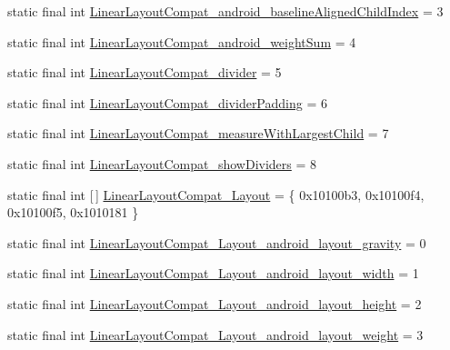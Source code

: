 \begin{DoxyCompactItemize}
\item 
static final int \mbox{\hyperlink{classandroid_1_1support_1_1v7_1_1appcompat_1_1_r_1_1styleable_a1e2dfafdd5b19904cd76f4e712341057}{Linear\+Layout\+Compat\+\_\+android\+\_\+baseline\+Aligned\+Child\+Index}} = 3
\item 
static final int \mbox{\hyperlink{classandroid_1_1support_1_1v7_1_1appcompat_1_1_r_1_1styleable_ac4c2540eeae4dc81e94e057cf2ba0152}{Linear\+Layout\+Compat\+\_\+android\+\_\+weight\+Sum}} = 4
\item 
static final int \mbox{\hyperlink{classandroid_1_1support_1_1v7_1_1appcompat_1_1_r_1_1styleable_a280f61ae8c1eaeaed66b529aaa9a0e56}{Linear\+Layout\+Compat\+\_\+divider}} = 5
\item 
static final int \mbox{\hyperlink{classandroid_1_1support_1_1v7_1_1appcompat_1_1_r_1_1styleable_a590418ec37cda0b60e090e85aeaaaaf2}{Linear\+Layout\+Compat\+\_\+divider\+Padding}} = 6
\item 
static final int \mbox{\hyperlink{classandroid_1_1support_1_1v7_1_1appcompat_1_1_r_1_1styleable_a2d49ec7be658708f20310983285edb54}{Linear\+Layout\+Compat\+\_\+measure\+With\+Largest\+Child}} = 7
\item 
static final int \mbox{\hyperlink{classandroid_1_1support_1_1v7_1_1appcompat_1_1_r_1_1styleable_adfc38ee5928f010cbae4576b71478b52}{Linear\+Layout\+Compat\+\_\+show\+Dividers}} = 8
\item 
static final int \mbox{[}$\,$\mbox{]} \mbox{\hyperlink{classandroid_1_1support_1_1v7_1_1appcompat_1_1_r_1_1styleable_abdf078c09964c82c7af689bed5e6f564}{Linear\+Layout\+Compat\+\_\+\+Layout}} = \{ 0x10100b3, 0x10100f4, 0x10100f5, 0x1010181 \}
\item 
static final int \mbox{\hyperlink{classandroid_1_1support_1_1v7_1_1appcompat_1_1_r_1_1styleable_a41408b82afaf90814a6a867440e582f4}{Linear\+Layout\+Compat\+\_\+\+Layout\+\_\+android\+\_\+layout\+\_\+gravity}} = 0
\item 
static final int \mbox{\hyperlink{classandroid_1_1support_1_1v7_1_1appcompat_1_1_r_1_1styleable_ae18e73da094affbe6cd30ba3ee016462}{Linear\+Layout\+Compat\+\_\+\+Layout\+\_\+android\+\_\+layout\+\_\+width}} = 1
\item 
static final int \mbox{\hyperlink{classandroid_1_1support_1_1v7_1_1appcompat_1_1_r_1_1styleable_acdd283d6d9bf29093b48617cafb4fdbd}{Linear\+Layout\+Compat\+\_\+\+Layout\+\_\+android\+\_\+layout\+\_\+height}} = 2
\item 
static final int \mbox{\hyperlink{classandroid_1_1support_1_1v7_1_1appcompat_1_1_r_1_1styleable_a4c9a442a48c1fc614818cd237de9a9a9}{Linear\+Layout\+Compat\+\_\+\+Layout\+\_\+android\+\_\+layout\+\_\+weight}} = 3

\end{DoxyCompactItemize}

